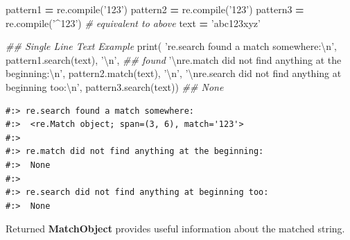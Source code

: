 \documentclass[
]{book}
\newenvironment{Shaded}{\begin{snugshade}}{\end{snugshade}}
\newcommand{\BuiltInTok}[1]{#1}
\newcommand{\CharTok}[1]{\textcolor[rgb]{0.5,0.5,0.5}{#1}}
\newcommand{\CommentTok}[1]{\textcolor[rgb]{0.37,0.37,0.37}{\textit{#1}}}
\newcommand{\NormalTok}[1]{#1}
\newcommand{\OperatorTok}[1]{\textcolor[rgb]{0.43,0.43,0.43}{\textbf{#1}}}
\newcommand{\StringTok}[1]{\textcolor[rgb]{0.5,0.5,0.5}{#1}}
\begin{document}
\begin{Shaded}
\begin{Highlighting}[]
\NormalTok{pattern1 }\OperatorTok{=}\NormalTok{ re.}\BuiltInTok{compile}\NormalTok{(}\StringTok{'123'}\NormalTok{) }
\NormalTok{pattern2 }\OperatorTok{=}\NormalTok{ re.}\BuiltInTok{compile}\NormalTok{(}\StringTok{'123'}\NormalTok{)}
\NormalTok{pattern3 }\OperatorTok{=}\NormalTok{ re.}\BuiltInTok{compile}\NormalTok{(}\StringTok{'^123'}\NormalTok{)  }\CommentTok{# equivalent to above}
\NormalTok{text }\OperatorTok{=} \StringTok{'abc123xyz'}

\CommentTok{## Single Line Text Example}
\BuiltInTok{print}\NormalTok{( }\StringTok{'re.search found a match somewhere:}\CharTok{\textbackslash{}n}\StringTok{'}\NormalTok{,}
\NormalTok{       pattern1.search(text), }\StringTok{'}\CharTok{\textbackslash{}n}\StringTok{'}\NormalTok{, }\CommentTok{## found}
       \StringTok{'}\CharTok{\textbackslash{}n}\StringTok{re.match did not find anything at the beginning:}\CharTok{\textbackslash{}n}\StringTok{'}\NormalTok{,}
\NormalTok{       pattern2.match(text), }\StringTok{'}\CharTok{\textbackslash{}n}\StringTok{'}\NormalTok{,}
       \StringTok{'}\CharTok{\textbackslash{}n}\StringTok{re.search did not find anything at beginning too:}\CharTok{\textbackslash{}n}\StringTok{'}\NormalTok{,}
\NormalTok{       pattern3.search(text))        }\CommentTok{## None}
\end{Highlighting}
\end{Shaded}

\begin{verbatim}
#:> re.search found a match somewhere:
#:>  <re.Match object; span=(3, 6), match='123'> 
#:>  
#:> re.match did not find anything at the beginning:
#:>  None 
#:>  
#:> re.search did not find anything at beginning too:
#:>  None
\end{verbatim}

Returned \textbf{MatchObject} provides useful information about the matched string.
\end{document}
